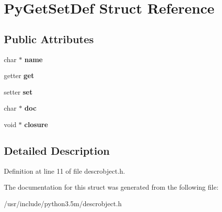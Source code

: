 \hypertarget{structPyGetSetDef}{}\section{Py\+Get\+Set\+Def Struct Reference}
\label{structPyGetSetDef}
\subsection*{Public Attributes}
\begin{DoxyCompactItemize}
\item 
char $\ast$ {\bfseries name}\hypertarget{structPyGetSetDef_a30046cd8a0375471ba84475c49feea5b}{}\label{structPyGetSetDef_a30046cd8a0375471ba84475c49feea5b}

\item 
getter {\bfseries get}\hypertarget{structPyGetSetDef_a88b9bd1a9bde46a5bd261e03927219fa}{}\label{structPyGetSetDef_a88b9bd1a9bde46a5bd261e03927219fa}

\item 
setter {\bfseries set}\hypertarget{structPyGetSetDef_ae8d938614fa25c86819f06926e28e353}{}\label{structPyGetSetDef_ae8d938614fa25c86819f06926e28e353}

\item 
char $\ast$ {\bfseries doc}\hypertarget{structPyGetSetDef_ab3ac0bcf9fada67b8a33854192c23226}{}\label{structPyGetSetDef_ab3ac0bcf9fada67b8a33854192c23226}

\item 
void $\ast$ {\bfseries closure}\hypertarget{structPyGetSetDef_ac680cc547d4fe42a3a70d85b3c7a3b31}{}\label{structPyGetSetDef_ac680cc547d4fe42a3a70d85b3c7a3b31}

\end{DoxyCompactItemize}


\subsection{Detailed Description}


Definition at line 11 of file descrobject.\+h.



The documentation for this struct was generated from the following file\+:\begin{DoxyCompactItemize}
\item 
/usr/include/python3.\+5m/descrobject.\+h\end{DoxyCompactItemize}
